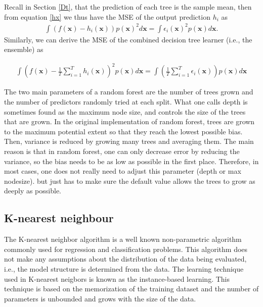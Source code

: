 Recall in Section \ref{Dt}, that the prediction of  each tree is the sample mean, then from equation \ref{hx} we thus have the MSE of the output prediction $h_i$ as 
\begin{align}
\int (f(\textbf{x})-h_{i}(\textbf{x}))p(\textbf{x})^2d\textbf{x} = \int \epsilon_{i} (\textbf{x})^2 p(\textbf{x})d\textbf{x}.
\end{align}
Similarly, we can derive the MSE of the combined decision tree learner (i.e., the ensemble) as 

\begin{align}
\int \left(f(\textbf{x}) - \frac{1}{T}\sum_{i=1}^{T} h_{i}(\textbf{x}) \right)^2  p(\textbf{x})d\textbf{x} = \int \left( \frac{1}{T}\sum_{i=1}^{T} \epsilon_{i}(\textbf{x})\right)p(\textbf{x})d\textbf{x}
\end{align} 


The two main parameters of a random forest are the number of trees grown and the number of predictors randomly tried at each split. What one calls depth is sometimes found as the maximum node size, and controls the size of the trees that are grown. In the original implementation of random forest, trees are grown to the maximum potential extent so that they reach the lowest possible bias. Then, variance is reduced by growing many trees and averaging them. The main reason is that in random forest, one can only decrease error by reducing the variance, so the bias needs to be as low as possible in the first place. Therefore, in most cases, one does not really need to adjust this parameter (depth or max nodesize). but just has to make sure the default value allows the trees to grow as deeply as possible.

\subsection{K-nearest neighbour}

The K-nearest neighbor algorithm is a well known non-parametric algorithm commonly used for regression and classification problems. This algorithm does not make any assumptions about the distribution of the data being evaluated, i.e., the model structure is determined from the data. The learning technique used in K-nearest neigbors is known as the instance-based learning. This technique is based on the memorization of the training dataset and the number of parameters is unbounded and grows with the size of the data. 

